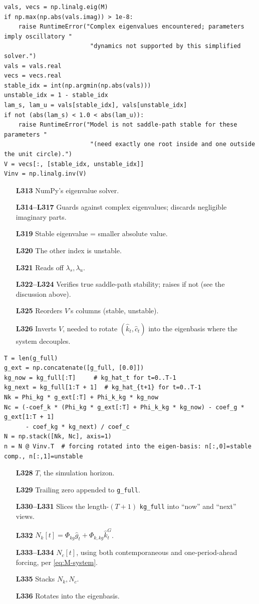 \documentclass[11pt]{article}
\begin{document}
\begin{lstlisting}[firstnumber=313]
vals, vecs = np.linalg.eig(M)
if np.max(np.abs(vals.imag)) > 1e-8:
    raise RuntimeError("Complex eigenvalues encountered; parameters imply oscillatory "
                        "dynamics not supported by this simplified solver.")
vals = vals.real
vecs = vecs.real
stable_idx = int(np.argmin(np.abs(vals)))
unstable_idx = 1 - stable_idx
lam_s, lam_u = vals[stable_idx], vals[unstable_idx]
if not (abs(lam_s) < 1.0 < abs(lam_u)):
    raise RuntimeError("Model is not saddle-path stable for these parameters "
                        "(need exactly one root inside and one outside the unit circle).")
V = vecs[:, [stable_idx, unstable_idx]]
Vinv = np.linalg.inv(V)
\end{lstlisting}
\begin{itemize}
\item[\textbf{L313}] NumPy's eigenvalue solver.
\item[\textbf{L314--L317}] Guards against complex eigenvalues; discards
negligible imaginary parts.
\item[\textbf{L319}] Stable eigenvalue = smaller absolute value.
\item[\textbf{L320}] The other index is unstable.
\item[\textbf{L321}] Reads off $\lambda_s,\lambda_u$.
\item[\textbf{L322--L324}] Verifies true saddle-path stability; raises if
not (see the discussion above).
\item[\textbf{L325}] Reorders $V$'s columns (stable, unstable).
\item[\textbf{L326}] Inverts $V$, needed to rotate $(\hat k_t,\hat c_t)$
into the eigenbasis where the system decouples.
\end{itemize}

\begin{lstlisting}[firstnumber=328]
T = len(g_full)
g_ext = np.concatenate([g_full, [0.0]])
kg_now = kg_full[:T]     # kg_hat_t for t=0..T-1
kg_next = kg_full[1:T + 1]  # kg_hat_{t+1} for t=0..T-1
Nk = Phi_kg * g_ext[:T] + Phi_k_kg * kg_now
Nc = (-coef_k * (Phi_kg * g_ext[:T] + Phi_k_kg * kg_now) - coef_g * g_ext[1:T + 1]
      - coef_kg * kg_next) / coef_c
N = np.stack([Nk, Nc], axis=1)
n = N @ Vinv.T  # forcing rotated into the eigen-basis: n[:,0]=stable comp., n[:,1]=unstable
\end{lstlisting}
\begin{itemize}
\item[\textbf{L328}] $T$, the simulation horizon.
\item[\textbf{L329}] Trailing zero appended to \texttt{g\_full}.
\item[\textbf{L330--L331}] Slices the length-$(T+1)$ \texttt{kg\_full} into
``now'' and ``next'' views.
\item[\textbf{L332}] $N_k[t]=\Phi_{kg}\hat g_t+\Phi_{k,kg}\hat k^G_t$.
\item[\textbf{L333--L334}] $N_c[t]$, using both contemporaneous and
one-period-ahead forcing, per \eqref{eq:M-system}.
\item[\textbf{L335}] Stacks $N_k,N_c$.
\item[\textbf{L336}] Rotates into the eigenbasis.
\end{itemize}
\end{document}
